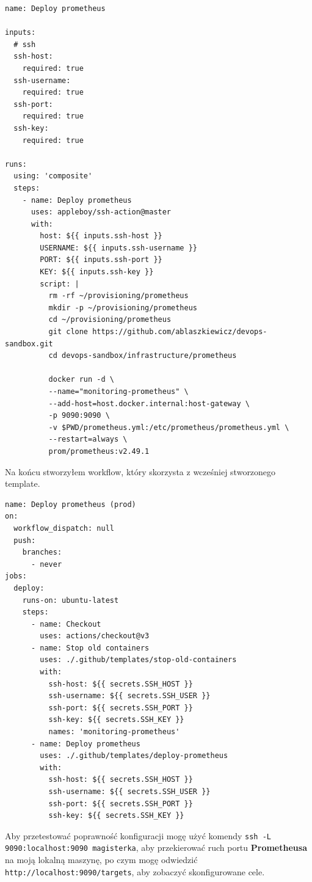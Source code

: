 \documentclass{article}
\begin{document}
\begin{lstlisting}[caption=Plik \texttt{.github/templates/deploy-prometheus/action.yml}]
name: Deploy prometheus

inputs:
  # ssh
  ssh-host:
    required: true
  ssh-username:
    required: true
  ssh-port:
    required: true
  ssh-key:
    required: true

runs:
  using: 'composite'
  steps:
    - name: Deploy prometheus
      uses: appleboy/ssh-action@master
      with:
        host: ${{ inputs.ssh-host }}
        USERNAME: ${{ inputs.ssh-username }}
        PORT: ${{ inputs.ssh-port }}
        KEY: ${{ inputs.ssh-key }}
        script: |
          rm -rf ~/provisioning/prometheus
          mkdir -p ~/provisioning/prometheus
          cd ~/provisioning/prometheus
          git clone https://github.com/ablaszkiewicz/devops-sandbox.git
          cd devops-sandbox/infrastructure/prometheus

          docker run -d \
          --name="monitoring-prometheus" \
          --add-host=host.docker.internal:host-gateway \
          -p 9090:9090 \
          -v $PWD/prometheus.yml:/etc/prometheus/prometheus.yml \
          --restart=always \
          prom/prometheus:v2.49.1
\end{lstlisting}

Na końcu stworzyłem workflow, który skorzysta z wcześniej stworzonego template.

\begin{lstlisting}[caption=Plik \texttt{.github/workflows/prod-deploy-prometheus.yml}]
name: Deploy prometheus (prod)
on:
  workflow_dispatch: null
  push:
    branches:
      - never
jobs:
  deploy:
    runs-on: ubuntu-latest
    steps:
      - name: Checkout
        uses: actions/checkout@v3
      - name: Stop old containers
        uses: ./.github/templates/stop-old-containers
        with:
          ssh-host: ${{ secrets.SSH_HOST }}
          ssh-username: ${{ secrets.SSH_USER }}
          ssh-port: ${{ secrets.SSH_PORT }}
          ssh-key: ${{ secrets.SSH_KEY }}
          names: 'monitoring-prometheus'
      - name: Deploy prometheus
        uses: ./.github/templates/deploy-prometheus
        with:
          ssh-host: ${{ secrets.SSH_HOST }}
          ssh-username: ${{ secrets.SSH_USER }}
          ssh-port: ${{ secrets.SSH_PORT }}
          ssh-key: ${{ secrets.SSH_KEY }}

\end{lstlisting}

Aby przetestować poprawność konfiguracji mogę użyć komendy \lstinline|ssh -L 9090:localhost:9090 magisterka|, aby przekierować ruch portu \textbf{Prometheusa} na moją lokalną maszynę, po czym mogę odwiedzić \lstinline|http://localhost:9090/targets|, aby zobaczyć skonfigurowane cele.
\end{document}
